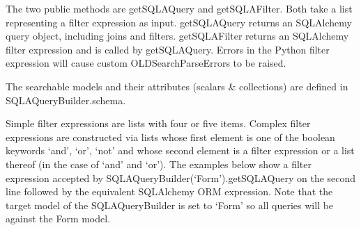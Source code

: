 \documentclass[letterpaper,10pt,english]{sphinxmanual}
\begin{document}
The two public methods are getSQLAQuery and getSQLAFilter.  Both take a list
representing a filter expression as input.  getSQLAQuery returns an SQLAlchemy
query object, including joins and filters.  getSQLAFilter returns an SQLAlchemy
filter expression and is called by getSQLAQuery.  Errors in the Python filter
expression will cause custom OLDSearchParseErrors to be raised.

The searchable models and their attributes (scalars \& collections) are defined
in SQLAQueryBuilder.schema.

Simple filter expressions are lists with four or five items.  Complex filter
expressions are constructed via lists whose first element is one of the boolean
keywords `and', `or', `not' and whose second element is a filter expression or
a list thereof (in the case of `and' and `or').  The examples below show a
filter expression accepted by SQLAQueryBuilder(`Form').getSQLAQuery on the
second line followed by the equivalent SQLAlchemy ORM expression.  Note that the
target model of the SQLAQueryBuilder is set to `Form' so all queries will be
against the Form model.
\end{document}
